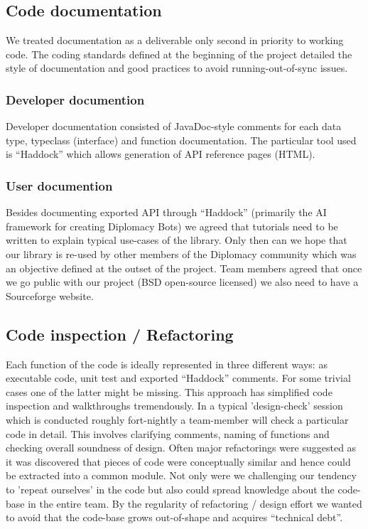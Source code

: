 \documentclass[pdftex,11pt,a4paper]{report}
\begin{document}
\subsection{Code documentation}

We treated documentation as a deliverable only second in priority to
working code. The coding standards defined at the beginning of the
project detailed the style of documentation and good practices to
avoid running-out-of-sync issues.

\subsubsection{Developer documention}

Developer documentation consisted of JavaDoc-style comments for each
data type, typeclass (interface) and function documentation. The
particular tool used is ``Haddock'' which allows generation of API
reference pages (HTML).

\subsubsection{User documention}
Besides documenting exported API through ``Haddock'' (primarily the AI
framework for creating Diplomacy Bots) we agreed that tutorials need
to be written to explain typical use-cases of the library. Only then
can we hope that our library is re-used by other members of the
Diplomacy community which was an objective defined at the outset of
the project. Team members agreed that once we go public with our
project (BSD open-source licensed) we also need to have a Sourceforge
website.

\subsection{Code inspection / Refactoring}
Each function of the code is ideally represented in three different
ways: as executable code, unit test and exported ``Haddock''
comments. For some trivial cases one of the latter might be
missing. This approach has simplified code inspection and walkthroughs
tremendously. In a typical 'design-check' session which is conducted
roughly fort-nightly a team-member will check a particular code in
detail. This involves clarifying comments, naming of functions and
checking overall soundness of design. Often major refactorings were
suggested as it was discovered that pieces of code were conceptually
similar and hence could be extracted into a common module. Not only
were we challenging our tendency to 'repeat ourselves' in the code but
also could spread knowledge about the code-base in the entire team. By
the regularity of refactoring / design effort we wanted to avoid that
the code-base grows out-of-shape and acquires ``technical debt''.
\end{document}
